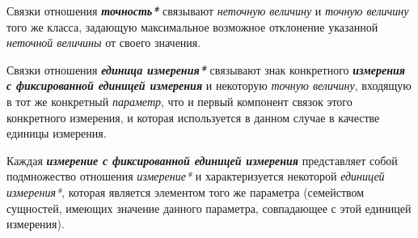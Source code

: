 \begin{SCn}
\end{SCn}

Связки отношения \textbf{\textit{точность*}} связывают \textit{неточную величину} и \textit{точную величину} того же класса, задающую максимальное возможное отклонение указанной \textit{неточной величины} от своего значения.
	
%	
\begin{SCn}
\end{SCn}

Связки отношения \textbf{\textit{единица измерения*}} связывают знак конкретного \textbf{\textit{измерения с фиксированной единицей измерения}} и некоторую \textit{точную величину}, входящую в тот же конкретный \textit{параметр}, что и первый компонент связок этого конкретного измерения, и которая используется в данном случае в качестве единицы измерения.
	
\begin{SCn}
\end{SCn}

Каждая \textbf{\textit{измерение с фиксированной единицей измерения}} представляет собой подмножество отношения \textit{измерение*} и характеризуется некоторой \textit{единицей измерения*}, которая является элементом того же параметра (семейством сущностей, имеющих значение данного параметра, совпадающее с этой единицей измерения).
	
\begin{SCn}
\end{SCn}

